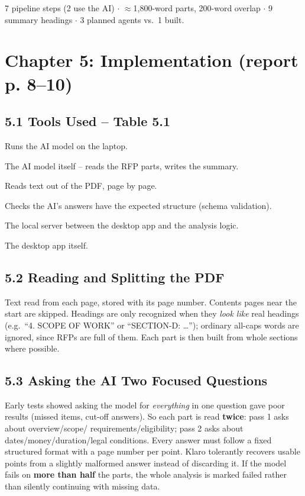 \documentclass[11pt,a4paper]{article}
\begin{document}
\begin{keynums}
7 pipeline steps (2 use the AI) $\cdot$ $\approx$1{,}800-word parts, 200-word overlap $\cdot$ 9 summary
headings $\cdot$ 3 planned agents vs.\ 1 built.
\end{keynums}

\newpage
\section{Chapter 5: Implementation (report p. 8--10)}

\subsection*{5.1 Tools Used -- Table 5.1}
\begin{description}[leftmargin=2.6cm,style=nextline]
  \item[Ollama {[13]}] Runs the AI model on the laptop.
  \item[Qwen3.5 4B {[14]}] The AI model itself -- reads the RFP parts, writes the summary.
  \item[Python + pypdf {[15]}] Reads text out of the PDF, page by page.
  \item[Pydantic {[16]}] Checks the AI's answers have the expected structure (schema validation).
  \item[FastAPI {[17]}] The local server between the desktop app and the analysis logic.
  \item[Electron + React {[18]}] The desktop app itself.
\end{description}

\subsection*{5.2 Reading and Splitting the PDF}
Text read from each page, stored with its page number. Contents pages near the start are skipped.
Headings are only recognized when they \emph{look like} real headings (e.g.\ ``4. SCOPE OF WORK'' or
``SECTION-D: \dots''); ordinary all-caps words are ignored, since RFPs are full of them. Each part is
then built from whole sections where possible.

\subsection*{5.3 Asking the AI Two Focused Questions}
Early tests showed asking the model for \emph{everything} in one question gave poor results (missed
items, cut-off answers). So each part is read \textbf{twice}: pass 1 asks about overview/scope/
requirements/eligibility; pass 2 asks about dates/money/duration/legal conditions. Every answer must
follow a fixed structured format with a page number per point. Klaro tolerantly recovers usable points
from a slightly malformed answer instead of discarding it. If the model fails on \textbf{more than
half} the parts, the whole analysis is marked failed rather than silently continuing with missing
data.
\end{document}
